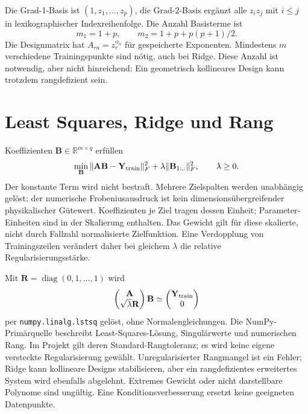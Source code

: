 Die Grad-1-Basis ist $(1,z_1,\ldots,z_p)$, die Grad-2-Basis ergänzt alle
$z_i z_j$ mit $i\le j$ in lexikographischer Indexreihenfolge.
Die Anzahl Basisterme ist
\begin{equation}\label{eq:surrogate-basis}
m_1=1+p,\qquad m_2=1+p+p(p+1)/2.
\end{equation}
Die Designmatrix hat $A_{ra}=z_r^{\alpha_a}$ für gespeicherte Exponenten.
Mindestens $m$ verschiedene Trainingspunkte sind nötig, auch bei Ridge.
Diese Anzahl ist notwendig, aber nicht hinreichend: Ein geometrisch
kollineares Design kann trotzdem rangdefizient sein.

\section{Least Squares, Ridge und Rang}
Koeffizienten $\mathbf B\in\mathbb R^{m\times q}$ erfüllen
\begin{equation}\label{eq:ridge}
\min_{\mathbf B}\|\mathbf A\mathbf B-\mathbf Y_{\rm train}\|_F^2
+\lambda\|\mathbf B_{1:, :}\|_F^2,\qquad\lambda\ge0.
\end{equation}
Der konstante Term wird nicht bestraft. Mehrere Zielspalten werden unabhängig
gelöst; der numerische Frobeniusausdruck ist kein dimensionsübergreifender
physikalischer Gütewert. Koeffizienten je Ziel tragen dessen Einheit;
Parameter-Einheiten sind in der Skalierung enthalten.
Das Gewicht gilt für diese skalierte, nicht durch Fallzahl normalisierte
Zielfunktion. Eine Verdopplung von Trainingszeilen verändert daher bei gleichem
$\lambda$ die relative Regularisierungsstärke.

Mit $\mathbf R=\operatorname{diag}(0,1,\ldots,1)$ wird
\begin{equation}\label{eq:augmented-lstsq}
\begin{pmatrix}\mathbf A\\\sqrt\lambda\mathbf R\end{pmatrix}\mathbf B
\simeq\begin{pmatrix}\mathbf Y_{\rm train}\\0\end{pmatrix}
\end{equation}
per \texttt{numpy.linalg.lstsq} gelöst, ohne Normalengleichungen.
Die NumPy-Primärquelle \cite{numpy-lstsq} beschreibt Least-Squares-Lösung,
Singulärwerte und numerischen Rang. Im Projekt gilt deren Standard-Rangtoleranz;
es wird keine eigene versteckte Regularisierung gewählt.
Unregularisierter Rangmangel ist ein Fehler; Ridge kann kollineare Designs
stabilisieren, aber ein rangdefizientes erweitertes System wird ebenfalls
abgelehnt. Extremes Gewicht oder nicht darstellbare Polynome sind ungültig.
Eine Konditionsverbesserung ersetzt keine geeigneten Datenpunkte.

